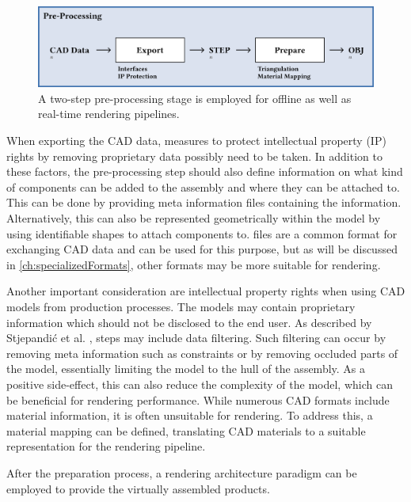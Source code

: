 \begin{figure}[H]
  \centering
  \includegraphics[width=0.9\columnwidth]{resources/cad-pipeline-preprocessing.png}
  \caption{A two-step pre-processing stage is employed for offline as well as real-time rendering pipelines.}
  \label{fig:cad-preprocessing}
\end{figure}

When exporting the CAD data, measures to protect intellectual property (IP) rights by removing proprietary data possibly need to be taken. In addition to these factors, the pre-processing step should also define information on what kind of components can be added to the assembly and where they can be attached to. This can be done by providing meta information files containing the information. Alternatively, this can also be represented geometrically within the model by using identifiable shapes to attach components to.  files are a common format for exchanging CAD data and can be used for this purpose, but as will be discussed in \autoref{ch:specializedFormats}, other formats may be more suitable for rendering.

Another important consideration are intellectual property rights when using \gls{CAD} models from production processes. The models may contain proprietary information which should not be disclosed to the end user. As described by Stjepandić et al. \cite{ipr}, steps may include data filtering. Such filtering can occur by removing meta information such as constraints or by removing occluded parts of the model, essentially limiting the model to the hull of the assembly. As a positive side-effect, this can also reduce the complexity of the model, which can be beneficial for rendering performance.
While numerous \gls{CAD} formats include material information, it is often unsuitable for rendering. To address this, a material mapping can be defined, translating \gls{CAD} materials to a suitable representation for the rendering pipeline.

After the preparation process, a rendering architecture paradigm can be employed to provide the virtually assembled products.

